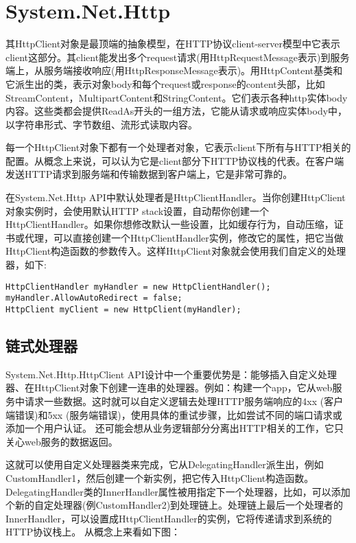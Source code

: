 \documentclass{ctexbook}
\begin{document}
	\section{System.Net.Http}
	其HttpClient对象是最顶端的抽象模型，在HTTP协议client-server模型中它表示client这部分。其client能发出多个request请求(用HttpRequestMessage表示)到服务端上，从服务端接收响应(用HttpResponseMessage表示)。用HttpContent基类和它派生出的类，表示对象body和每个request或response的content头部，比如StreamContent，MultipartContent和StringContent。它们表示各种http实体body内容。这些类都会提供ReadAs开头的一组方法，它能从请求或响应实体body中，以字符串形式、字节数组、流形式读取内容。
	
	每一个HttpClient对象下都有一个处理者对象，它表示client下所有与HTTP相关的配置。从概念上来说，可以认为它是client部分下HTTP协议栈的代表。在客户端发送HTTP请求到服务端和传输数据到客户端上，它是非常可靠的。
	
	在System.Net.Http API中默认处理者是HttpClientHandler。当你创建HttpClient对象实例时，会使用默认HTTP stack设置，自动帮你创建一个HttpClientHandler。如果你想修改默认一些设置，比如缓存行为，自动压缩，证书或代理，可以直接创建一个HttpClientHandler实例，修改它的属性，把它当做HttpClient构造函数的参数传入。这样HttpClient对象就会使用我们自定义的处理器，如下:
	
\begin{verbatim}
HttpClientHandler myHandler = new HttpClientHandler(); 
myHandler.AllowAutoRedirect = false; 
HttpClient myClient = new HttpClient(myHandler);
\end{verbatim}

\subsection{链式处理器}
System.Net.Http.HttpClient API设计中一个重要优势是：能够插入自定义处理器、在HttpClient对象下创建一连串的处理器。例如：构建一个app，它从web服务中请求一些数据。这时就可以自定义逻辑去处理HTTP服务端响应的4xx (客户端错误)和5xx (服务端错误)，使用具体的重试步骤，比如尝试不同的端口请求或添加一个用户认证。 还可能会想从业务逻辑部分分离出HTTP相关的工作，它只关心web服务的数据返回。

这就可以使用自定义处理器类来完成，它从DelegatingHandler派生出，例如CustomHandler1，然后创建一个新实例，把它传入HttpClient构造函数。 DelegatingHandler类的InnerHandler属性被用指定下一个处理器，比如，可以添加个新的自定处理器(例CustomHandler2)到处理链上。处理链上最后一个处理者的InnerHandler，可以设置成HttpClientHandler的实例，它将传递请求到系统的HTTP协议栈上。 从概念上来看如下图：
\end{document}
